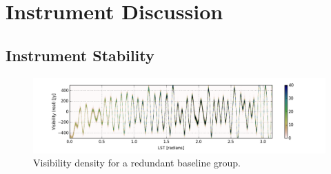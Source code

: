 \documentclass[twocolumn,numberedappendix]{emulateapj} \shorttitle{PSA64}
\begin{document}
%



\section{Instrument Discussion}\label{sec:instrument}
\subsection{Instrument Stability}

\begin{figure}[!t]
\centering
\includegraphics[width=2.3\columnwidth]{plots/density.png}
\caption{Visibility density for a redundant baseline group.}
\label{fig:density}
\end{figure}
\end{document}
